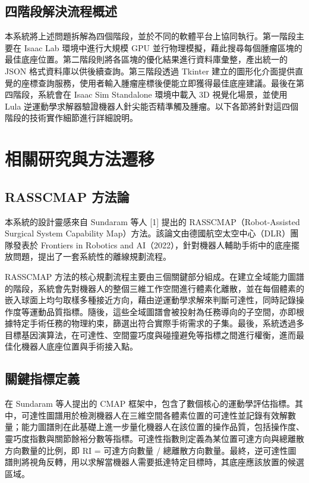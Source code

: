 \documentclass[a4paper, 12pt]{article}
\begin{document}
\subsection{四階段解決流程概述}

本系統將上述問題拆解為四個階段，並於不同的軟體平台上協同執行。第一階段主要在 Isaac Lab 環境中進行大規模 GPU 並行物理模擬，藉此搜尋每個腫瘤區塊的最佳底座位置。第二階段則將各區塊的優化結果進行資料庫彙整，產出統一的 JSON 格式資料庫以供後續查詢。第三階段透過 Tkinter 建立的圖形化介面提供直覺的座標查詢服務，使用者輸入腫瘤座標後便能立即獲得最佳底座建議。最後在第四階段，系統會在 Isaac Sim Standalone 環境中載入 3D 視覺化場景，並使用 Lula 逆運動學求解器驗證機器人針尖能否精準觸及腫瘤。以下各節將針對這四個階段的技術實作細節進行詳細說明。

\section{相關研究與方法遷移}
\label{sec:related_work}

\subsection{RASSCMAP 方法論}

本系統的設計靈感來自 Sundaram 等人 [1] 提出的 RASSCMAP（Robot-Assisted Surgical System Capability Map）方法。該論文由德國航空太空中心（DLR）團隊發表於 Frontiers in Robotics and AI（2022），針對機器人輔助手術中的底座擺放問題，提出了一套系統性的離線規劃流程。

RASSCMAP 方法的核心規劃流程主要由三個關鍵部分組成。在建立全域能力圖譜的階段，系統會先對機器人的整個三維工作空間進行體素化離散，並在每個體素的嵌入球面上均勻取樣多種接近方向，藉由逆運動學求解來判斷可達性，同時記錄操作度等運動品質指標。隨後，這些全域圖譜會被投射為任務導向的子空間，亦即根據特定手術任務的物理約束，篩選出符合實際手術需求的子集。最後，系統透過多目標基因演算法，在可達性、空間靈巧度與碰撞避免等指標之間進行權衡，進而最佳化機器人底座位置與手術接入點。

\subsection{關鍵指標定義}

在 Sundaram 等人提出的 CMAP 框架中，包含了數個核心的運動學評估指標。其中，可達性圖譜用於檢測機器人在三維空間各體素位置的可達性並記錄有效解數量；能力圖譜則在此基礎上進一步量化機器人在該位置的操作品質，包括操作度、靈巧度指數與關節餘裕分數等指標。可達性指數則定義為某位置可達方向與總離散方向數量的比例，即 RI = 可達方向數量 / 總離散方向數量。最終，逆可達性圖譜則將視角反轉，用以求解當機器人需要抵達特定目標時，其底座應該放置的候選區域。
\end{document}

